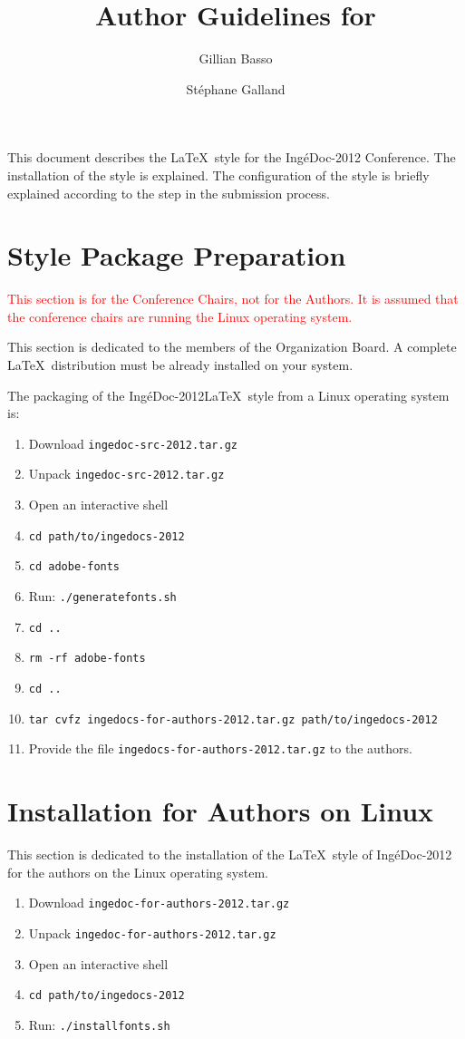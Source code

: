 \documentclass{ingedoc}
\title{Author Guidelines for \ingedocs}
\author{Gillian Basso\inst{1}\email{gillian.basso@utbm.fr} \and Stéphane Galland\inst{1}}
\affiliation{
IRTES-SET \\
Université de Technologie de Belfort-Montbéliard
}
\newcommand{\ingedocs}{IngéDoc-2012\xspace}
\begin{document}
This document describes the \LaTeX\ style for the \ingedocs Conference.
The installation of the style is explained. The configuration of the style is briefly explained according to the step in the submission process.

\section{Style Package Preparation}

\textcolor{red}{This section is for the Conference Chairs, not for the Authors. It is assumed that the conference chairs are running the Linux operating system.}

This section is dedicated to the members of the Organization Board. A complete \LaTeX\ distribution must be already installed on your system.

The packaging of the \ingedocs \LaTeX\ style from a Linux operating system is:
\begin{enumerate}
\item Download \texttt{ingedoc-src-2012.tar.gz}
\item Unpack \texttt{ingedoc-src-2012.tar.gz}
\item Open an interactive shell
\item \texttt{cd path/to/ingedocs-2012}
\item \texttt{cd adobe-fonts}
\item Run: \texttt{./generatefonts.sh}
\item \texttt{cd ..}
\item \texttt{rm -rf adobe-fonts}
\item \texttt{cd ..}
\item \texttt{tar cvfz ingedocs-for-authors-2012.tar.gz path/to/ingedocs-2012}
\item Provide the file \texttt{ingedocs-for-authors-2012.tar.gz} to the authors.
\end{enumerate}

\section{Installation for Authors on Linux}

This section is dedicated to the installation of the \LaTeX\ style of \ingedocs for the authors on the Linux operating system.

\begin{enumerate}
\item Download \texttt{ingedoc-for-authors-2012.tar.gz}
\item Unpack \texttt{ingedoc-for-authors-2012.tar.gz}
\item Open an interactive shell
\item \texttt{cd path/to/ingedocs-2012}
\item Run: \texttt{./installfonts.sh}
\end{enumerate}
\end{document}
